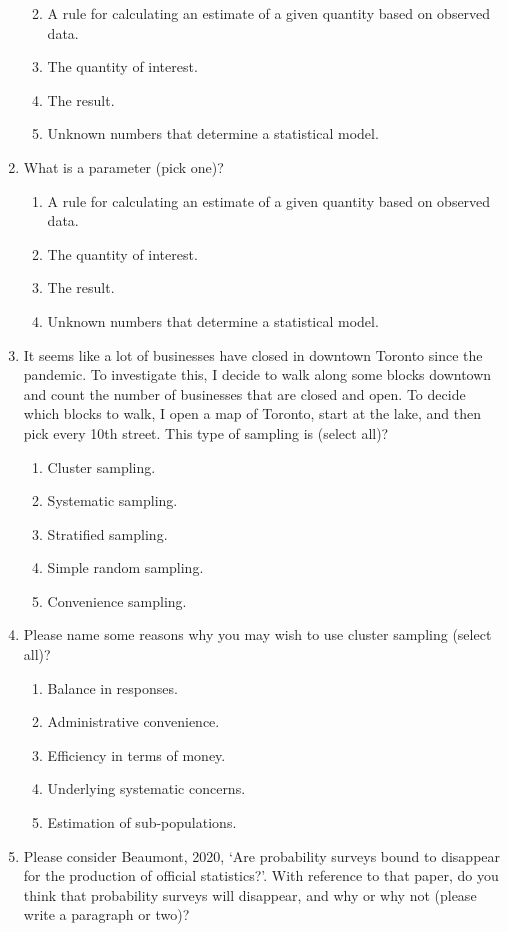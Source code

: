 \documentclass[
]{book}
\providecommand{\tightlist}{%
  \setlength{\itemsep}{0pt}\setlength{\parskip}{0pt}}
\begin{document}
\begin{enumerate}
  \begin{enumerate}
  \def\labelenumii{\alph{enumii}.}
  \tightlist
  \item
    A rule for calculating an estimate of a given quantity based on observed data.
  \item
    The quantity of interest.
  \item
    The result.
  \item
    Unknown numbers that determine a statistical model.
  \end{enumerate}
\item
  What is a parameter (pick one)?

  \begin{enumerate}
  \def\labelenumii{\alph{enumii}.}
  \tightlist
  \item
    A rule for calculating an estimate of a given quantity based on observed data.
  \item
    The quantity of interest.
  \item
    The result.
  \item
    Unknown numbers that determine a statistical model.
  \end{enumerate}
\item
  It seems like a lot of businesses have closed in downtown Toronto since the pandemic. To investigate this, I decide to walk along some blocks downtown and count the number of businesses that are closed and open. To decide which blocks to walk, I open a map of Toronto, start at the lake, and then pick every 10th street. This type of sampling is (select all)?

  \begin{enumerate}
  \def\labelenumii{\alph{enumii}.}
  \tightlist
  \item
    Cluster sampling.
  \item
    Systematic sampling.
  \item
    Stratified sampling.
  \item
    Simple random sampling.
  \item
    Convenience sampling.
  \end{enumerate}
\item
  Please name some reasons why you may wish to use cluster sampling (select all)?

  \begin{enumerate}
  \def\labelenumii{\alph{enumii}.}
  \tightlist
  \item
    Balance in responses.
  \item
    Administrative convenience.
  \item
    Efficiency in terms of money.
  \item
    Underlying systematic concerns.
  \item
    Estimation of sub-populations.
  \end{enumerate}
\item
  Please consider Beaumont, 2020, `Are probability surveys bound to disappear for the production of official statistics?'. With reference to that paper, do you think that probability surveys will disappear, and why or why not (please write a paragraph or two)?
\end{enumerate}
\end{document}
